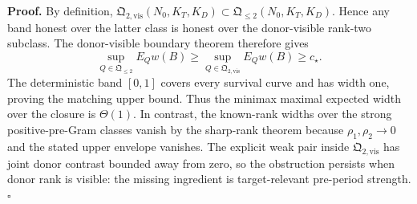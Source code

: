 \textbf{Proof.}
By definition,
\(\mathfrak Q_{2,\mathrm{vis}}(N_0,K_T,K_D)\subset
\mathfrak Q_{\le2}(N_0,K_T,K_D)\).  Hence any band honest over the latter class is honest over the donor-visible rank-two subclass.  The donor-visible boundary theorem therefore gives
\[
 \sup_{Q\in\mathfrak Q_{\le2}}E_Qw(B)
 \ge\sup_{Q\in\mathfrak Q_{2,\mathrm{vis}}}E_Qw(B)
 \ge c_\star.                                           \tag{1}
\]
The deterministic band \([0,1]\) covers every survival curve and has width one, proving the matching upper bound.  Thus the minimax maximal expected width over the closure is \(\Theta(1)\).  In contrast, the known-rank widths over the strong positive-pre-Gram classes vanish by the sharp-rank theorem because \(\rho_1,\rho_2\to0\) and the stated upper envelope vanishes.  The explicit weak pair inside \(\mathfrak Q_{2,\mathrm{vis}}\) has joint donor contrast bounded away from zero, so the obstruction persists when donor rank is visible: the missing ingredient is target-relevant pre-period strength. \(\square\)